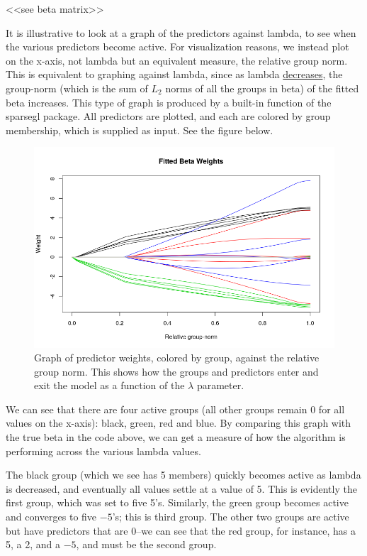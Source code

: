 \documentclass[titlepage]{article}
\begin{document}
<<see beta matrix>>

It is illustrative to look at a graph of the predictors against lambda, to see when the various predictors become active. For visualization reasons, we instead plot on the x-axis, not lambda but an equivalent measure, the relative group norm. This is equivalent to graphing against lambda, since as lambda \underline{decreases}, the group-norm (which is the sum of $L_2$ norms of all the groups in beta) of the fitted beta increases. This type of graph is produced by a built-in function of the sparsegl package. All predictors are plotted, and each are colored by group membership, which is supplied as input. See the figure below.


\begin{figure}[tb!]
\centering
\includegraphics[scale=0.5]{fitted_beta_weights.png}
\caption{Graph of predictor weights, colored by group, against the relative group norm. This shows how the groups and predictors enter and exit the model as a function of the $\lambda$ parameter.}
\label{fig:colorWeights}
\end{figure}

We can see that there are four active groups (all other groups remain 0 for all values on the x-axis): black, green, red and blue. By comparing this graph with the true beta in the code above, we can get a measure of how the algorithm is performing across the various lambda values.

The black group (which we see has 5 members) quickly becomes active as lambda is decreased, and eventually all values settle at a value of 5. This is evidently the first group, which was set to five 5's. Similarly, the green group becomes active and converges to five $-5$'s; this is third group. The other two groups are active but have predictors that are 0--we can see that the red group, for instance, has a 5, a 2, and a $-5$, and must be the second group.
\end{document}
